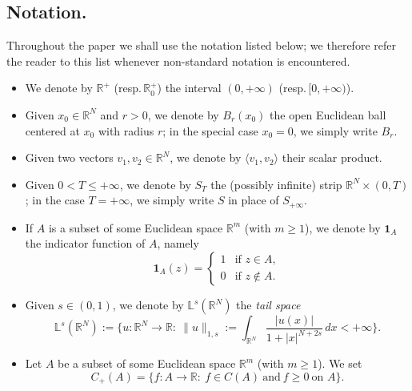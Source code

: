 \documentclass[11pt,a4paper,reqno]{amsart}
\def \R {\mathbb{R}}
\theoremstyle{definition}
\theoremstyle{plain}
\numberwithin{equation}{section}
\begin{document}
\subsection{Notation.}

Throughout the paper we shall use the notation listed below; we therefore refer the reader to this list whenever non-standard notation is encountered.

\begin{itemize}
 \item We denote by $\R^+$ (resp.\,$\R^+_0$) the interval $(0,+\infty)$ (resp.\,$[0,+\infty)$).
 \vspace*{0.1cm}

 \item Given $x_0\in\R^N$ and $r > 0$, we denote by $B_r(x_0)$ the open Euclidean ball centered at $x_0$ with radius $r$; in the special case $x_0 = 0$, we simply write $B_r$.
 \vspace*{0.1cm}

 \item Given two vectors $v_1,v_2 \in \mathbb{R}^N$, we denote by $\langle v_1,v_2\rangle$ their scalar product.
  \vspace*{0.1cm}
	
 \item Given $0<T\leq+\infty$, we denote by $S_T$ the (possibly infinite) strip $\R^N\times (0,T)$; in the case $T = +\infty$, we simply write $S$ in place of $S_{+\infty}$.
 \vspace*{0.1cm}

 \item If $A$ is a subset of some Euclidean space $\R^m$ (with $m\geq 1$), we denote by $\mathbf{1}_A$ the indicator function of $A$, namely
 $$\mathbf{1}_A(z) =
 \begin{cases}
 1 & \text{if $z\in A$}, \\
 0 & \text{if $z\notin A$}.
 \end{cases}
 $$
 \vspace*{0.1cm}

 \item Given $s\in (0,1)$, we denote by $\mathbb{L}^s(\mathbb{R}^N)$ the \emph{tail space}
 \begin{equation} \label{eq:spaceL1s}
 \mathbb{L}^s(\R^N) :=
 \Big\{u:\R^N\to\R:\ \|u\|_{1,s} := \int_{\R^N}\frac{|u(x)|}{1+|x|^{N+2s}}\,dx<+\infty\Big\}.
 \end{equation}

 \item Let $A$ be a subset of some Euclidean space $\R^m$ (with $m\geq 1$). We set
 \begin{equation} \label{eq:spaceCpositive}
 C_+(A) = \big\{f:A\to\mathbb{R}:\ f\in C(A)\ \text{and}\ f\geq 0\ \text{on } A\big\}.	
 \end{equation}


\end{itemize}
\end{document}
